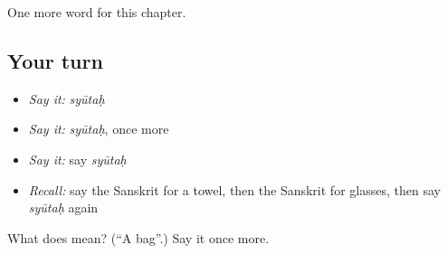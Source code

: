 \begin{grammarlens}[title={What you've built}]
One more word for this chapter.
\end{grammarlens}

\subsection*{Your turn}
\begin{itemize}
\raggedright
  \item \emph{Say it:} \emph{syūtaḥ}
  \item \emph{Say it:} \emph{syūtaḥ}, once more
  \item \emph{Say it:} say \emph{syūtaḥ}
  \item \emph{Recall:} say the Sanskrit for a towel, then the Sanskrit for glasses, then say \emph{syūtaḥ} again
\end{itemize}

\begin{tcolorbox}[breakable,colback=teal!4,colframe=teal!35!black,title={Before you move on}]
What does  mean? (\textquotedblleft{}A bag\textquotedblright{}.) Say it once more.
\end{tcolorbox}
